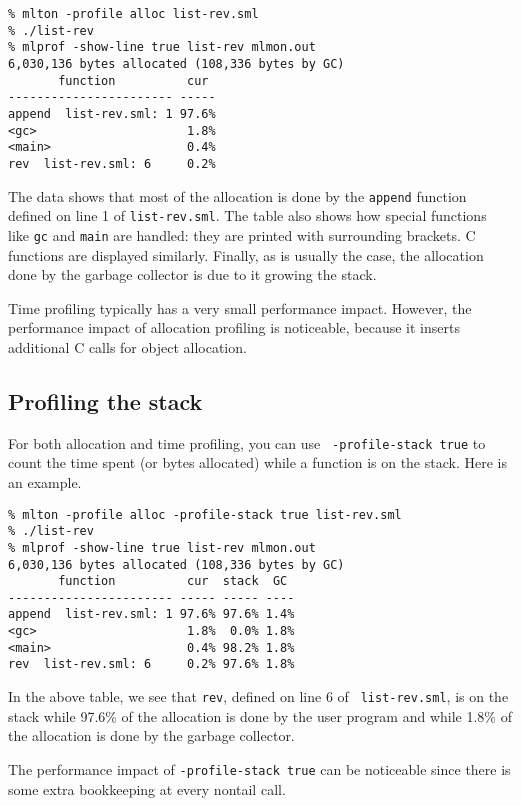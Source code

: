 \begin{verbatim}
% mlton -profile alloc list-rev.sml
% ./list-rev
% mlprof -show-line true list-rev mlmon.out
6,030,136 bytes allocated (108,336 bytes by GC)
       function          cur 
----------------------- -----
append  list-rev.sml: 1 97.6%
<gc>                     1.8%
<main>                   0.4%
rev  list-rev.sml: 6     0.2%
\end{verbatim}

The data shows that most of the allocation is done by the {\tt append}
function defined on line 1 of {\tt list-rev.sml}.  The table also
shows how special functions like {\tt gc} and {\tt main} are handled:
they are printed with surrounding brackets.  C functions are displayed
similarly.  Finally, as is usually the case, the allocation done by
the garbage collector is due to it growing the stack.

Time profiling typically has a very small performance impact.
However, the performance impact of allocation profiling is noticeable,
because it inserts additional C calls for object allocation.

\subsection{Profiling the stack}

For both allocation and time profiling, you can use {\tt
-profile-stack true} to count the time spent (or bytes allocated)
while a function is on the stack.  Here is an example.

\begin{verbatim}
% mlton -profile alloc -profile-stack true list-rev.sml
% ./list-rev
% mlprof -show-line true list-rev mlmon.out
6,030,136 bytes allocated (108,336 bytes by GC)
       function          cur  stack  GC 
----------------------- ----- ----- ----
append  list-rev.sml: 1 97.6% 97.6% 1.4%
<gc>                     1.8%  0.0% 1.8%
<main>                   0.4% 98.2% 1.8%
rev  list-rev.sml: 6     0.2% 97.6% 1.8%
\end{verbatim}

In the above table, we see that {\tt rev}, defined on line 6 of {\tt
list-rev.sml}, is on the stack while 97.6\% of the allocation is done
by the user program and while 1.8\% of the allocation is done by the
garbage collector. 

The performance impact of {\tt -profile-stack true} can be noticeable
since there is some extra bookkeeping at every nontail call.

